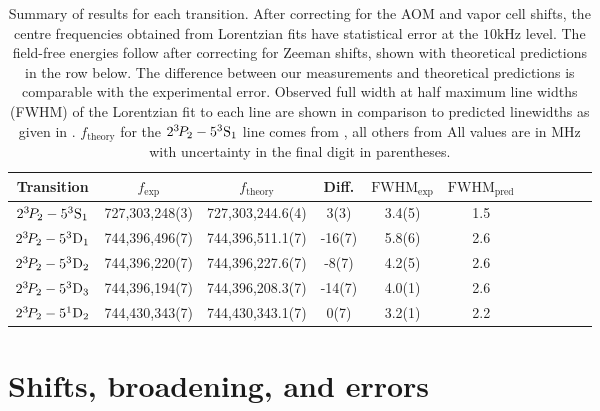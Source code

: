 \begin{table}
    \begin{tabular}{c c c c c c c c c c c}
      \hline\hline
      Transition                        &  $f_\textrm{exp}$ &  $f_\textrm{theory}$ & Diff.
		  &  $\textrm{FWHM}_{\textrm{exp}}$  &  $\textrm{FWHM}_{{\textrm{pred}}}$ \\
      \hline
        $2^{3\!} P_2 - 5^3\mathrm{S}_1$ &  {727,303,248(3)} &   727,303,244.6(4)   &  {3(3)}      &  3.4(5)  &  1.5\\ %
        $2^{3\!} P_2 - 5^3\mathrm{D}_1$ &  {744,396,496(7)} &   744,396,511.1(7)   &  {-16(7)}     &  5.8(6)  &  2.6\\
        $2^{3\!} P_2 - 5^3\mathrm{D}_2$ &  {744,396,220(7)} &   744,396,227.6(7)   &  {-8(7)}      &  4.2(5)  &  2.6\\
        $2^{3\!} P_2 - 5^3\mathrm{D}_3$ &  {744,396,194(7)} &   744,396,208.3(7)   &  {-14(7)}     &  4.0(1)  &  2.6\\
        $2^{3\!} P_2 - 5^1\mathrm{D}_2$ &  {744,430,343(7)} &   744,430,343.1(7)   &  {0(7)}      &  3.2(1)  &  2.2\\  %
      \hline\hline
    \end{tabular}
\caption{Summary of results for each transition.
	After correcting for the AOM and vapor cell shifts, the centre frequencies obtained from Lorentzian fits have statistical error at the $10\textrm{kHz}$ level.
	The field-free energies follow after correcting for Zeeman shifts, shown with theoretical predictions in the row below.
	The difference between our measurements and theoretical predictions is comparable with the experimental error.
	Observed full width at half maximum line widths (FWHM) of the Lorentzian fit to each line are shown in comparison to predicted linewidths as given in \cite{Drake07}.
	$f_\textrm{theory}$ for the $2^{3\!} P_2 - 5^3\mathrm{S}_1$ line comes from \cite{Drake07}, all others from \cite{Yerokhin20}
	All values are in MHz with uncertainty in the final digit in parentheses.}
  \label{tab:spec_results}
\end{table}

\section{Shifts, broadening, and errors}





